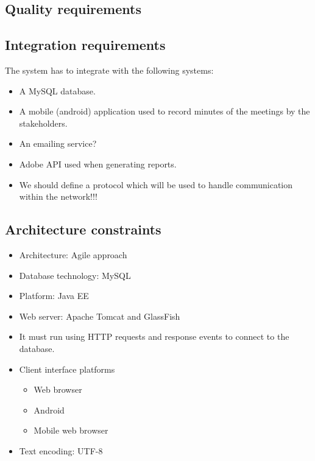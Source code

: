 \documentclass[12pt]{article}
\begin{document}
		\subsection{Quality requirements} %
		\vspace{0.2in}
		
		\vspace{0.2in}
		
		\subsection{Integration requirements} %
		\vspace{0.2in}
		The system has to integrate with the following systems:
		\begin{itemize}
			\item A MySQL database.
			\item A mobile (android) application used to record minutes of the meetings by the stakeholders. 
			\item An emailing service? %
			\item Adobe API used when generating reports.
			\item We should define a protocol which will be used to handle communication within the network!!!
		\end{itemize}
		\vspace{0.2in}
		
		\subsection{Architecture constraints} %
		\vspace{0.2in}
		\begin{itemize}
			\item Architecture: Agile approach
			\item Database technology: MySQL
			\item Platform: Java EE
			\item Web server: Apache Tomcat and GlassFish 
			\item It must run using HTTP requests and response events to connect to the
database.
			\item Client interface platforms 
				\begin{itemize}
					\item Web browser
					\item Android
					\item Mobile web browser
				\end{itemize}
			\item Text encoding: UTF-8
		\end{itemize}
		\vspace{0.5in}
	
\end{document}

